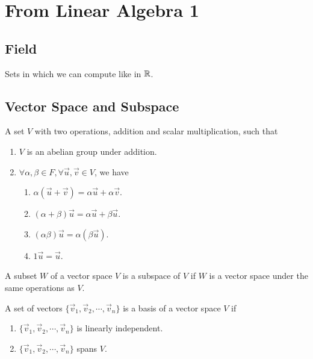 
\section{From Linear Algebra 1}

\subsection{Field}
\begin{definition}[Field]
    Sets in which we can compute like in $\mathbb{R}$.
\end{definition}

\subsection{Vector Space and Subspace}
\begin{definition}
    A set $V$ with two operations, addition and scalar multiplication, such that
    \begin{enumerate}
        \item $V$ is an abelian group under addition.
        \item $\forall \alpha, \beta \in F, \forall \vec{u}, \vec{v} \in V$, we have
            \begin{enumerate}
                \item $\alpha(\vec{u} + \vec{v}) = \alpha\vec{u} + \alpha\vec{v}$.
                \item $(\alpha + \beta)\vec{u} = \alpha\vec{u} + \beta\vec{u}$.
                \item $(\alpha\beta)\vec{u} = \alpha(\beta\vec{u})$.
                \item $1\vec{u} = \vec{u}$.
            \end{enumerate}
    \end{enumerate}
\end{definition}

\begin{definition}[Subspace]
    A subset $W$ of a vector space $V$ is a subspace of $V$ if $W$ is a vector space under the same operations as $V$.
\end{definition}

\begin{definition}[Bases]
    A set of vectors $\{\vec{v}_1, \vec{v}_2, \cdots, \vec{v}_n\}$ is a basis of a vector space $V$ if
    \begin{enumerate}
        \item $\{\vec{v}_1, \vec{v}_2, \cdots, \vec{v}_n\}$ is linearly independent.
        \item $\{\vec{v}_1, \vec{v}_2, \cdots, \vec{v}_n\}$ spans $V$.
    \end{enumerate}
\end{definition}

